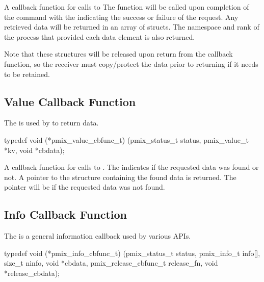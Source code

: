 A callback function for calls to 
The function will be called upon completion of the command with the  indicating the success or failure of the request.
Any retrieved data will be returned in an array of  structs.
The namespace and rank of the process that provided each data element is also returned.

Note that these structures will be released upon return from the callback function, so the receiver must copy/protect the data prior to returning if it needs to be retained.


\subsection{Value Callback Function}

\summary

The  is used by  to return data.

\cspecificstart
\begin{codepar}
typedef void (*pmix_value_cbfunc_t)
    (pmix_status_t status,
     pmix_value_t *kv, void *cbdata);
\end{codepar}
\cspecificend

\begin{arglist}
\end{arglist}


\descr

A callback function for calls to .
The  indicates if the requested data was found or not.
A pointer to the  structure containing the found data is returned.
The pointer will be  if the requested data was not found.


\subsection{Info Callback Function}

\summary

The  is a general information callback used by various APIs.

\cspecificstart
\begin{codepar}
typedef void (*pmix_info_cbfunc_t)
    (pmix_status_t status,
     pmix_info_t info[], size_t ninfo,
     void *cbdata,
     pmix_release_cbfunc_t release_fn,
     void *release_cbdata);
\end{codepar}
\cspecificend

